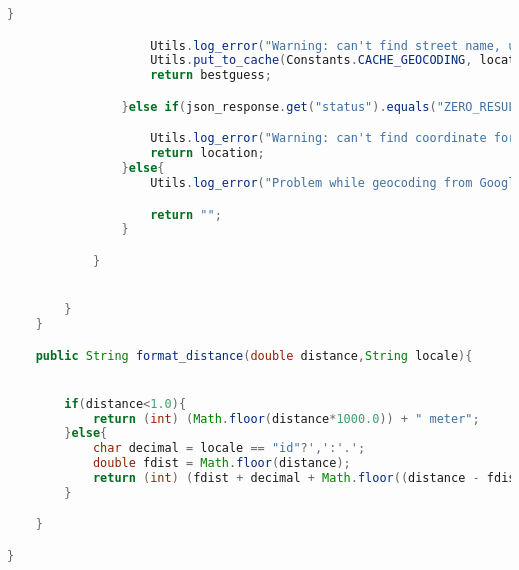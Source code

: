 \begin{lstlisting}[language=Java,basicstyle=\tiny,caption=Application.java]
                    }

                    Utils.log_error("Warning: can't find street name, use bestguess " + bestguess + " for " + location);
                    Utils.put_to_cache(Constants.CACHE_GEOCODING, location, bestguess);
                    return bestguess;

                }else if(json_response.get("status").equals("ZERO_RESULTS")){

                    Utils.log_error("Warning: can't find coordinate for" + location);
                    return location;
                }else{
                    Utils.log_error("Problem while geocoding from Google reverse geocoding: ");

                    return "";
                }

            }


        }
    }

    public String format_distance(double distance,String locale){


        if(distance<1.0){
            return (int) (Math.floor(distance*1000.0)) + " meter";
        }else{
            char decimal = locale == "id"?',':'.';
            double fdist = Math.floor(distance);
            return (int) (fdist + decimal + Math.floor((distance - fdist) * 10)) + " kilometer";
        }

    }

}

\end{lstlisting}